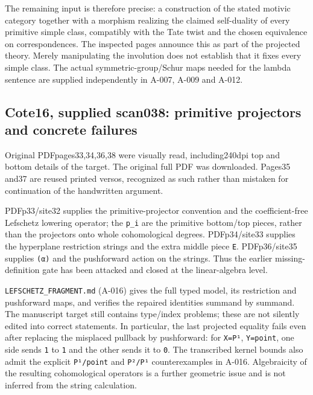 \documentclass[
  10pt,
]{article}
\begin{document}
The remaining input is therefore precise: a construction of the stated
motivic category together with a morphism realizing the claimed
self-duality of every primitive simple class, compatibly with the Tate
twist and the chosen equivalence on correspondences. The inspected pages
announce this as part of the projected theory. Merely manipulating the
involution does not establish that it fixes every simple class. The
actual symmetric-group/Schur maps needed for the lambda sentence are
supplied independently in A-007, A-009 and A-012.

\subsection{Cote16, supplied scan038: primitive projectors and concrete
failures}\label{cote16-supplied-scan038-primitive-projectors-and-concrete-failures}

Original PDFpages33,34,36,38 were visually read, including240dpi top and
bottom details of the target. The original full PDF was downloaded.
Pages35 and37 are reused printed versos, recognized as such rather than
mistaken for continuation of the handwritten argument.

PDFp33/site32 supplies the primitive-projector convention and the
coefficient-free Lefschetz lowering operator; the
\texttt{\small p\_\allowbreak{}i} are the primitive bottom/top pieces,
rather than the projectors onto whole cohomological degrees.
PDFp34/site33 supplies the hyperplane restriction strings and the extra
middle piece \texttt{\small E}. PDFp36/site35 supplies
\texttt{\small (\allowbreak{}α)\allowbreak{}} and the pushforward action
on the strings. Thus the earlier missing-definition gate has been
attacked and closed at the linear-algebra level.

\texttt{\small LEFSCHETZ\_\allowbreak{}FRAGMENT.md} (A-016) gives the
full typed model, its restriction and pushforward maps, and verifies the
repaired identities summand by summand. The manuscript target still
contains type/index problems; these are not silently edited into correct
statements. In particular, the last projected equality fails even after
replacing the misplaced pullback by pushforward: for
\texttt{\small X=\allowbreak{}P¹}, \texttt{\small Y=\allowbreak{}point},
one side sends \texttt{\small 1} to \texttt{\small 1} and the other
sends it to \texttt{\small 0}. The transcribed kernel bounds also admit
the explicit \texttt{\small P¹/\allowbreak{}point} and
\texttt{\small P²/\allowbreak{}P¹} counterexamples in A-016.
Algebraicity of the resulting cohomological operators is a further
geometric issue and is not inferred from the string calculation.
\end{document}

